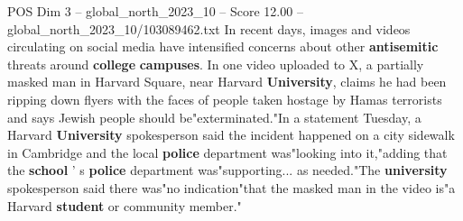\begin{textsample}{POS Dim 3 – global\_north\_2023\_10 – Score 12.00 – global\_north\_2023\_10/103089462.txt}
In recent days, images and videos circulating on social media have intensified concerns about other \textbf{antisemitic} threats around \textbf{college} \textbf{campuses}.
In one video uploaded to X, a partially masked man in Harvard Square, near Harvard \textbf{University}, claims he had been ripping down flyers with the faces of people taken hostage by Hamas terrorists and says Jewish people should be"exterminated."In a statement Tuesday, a Harvard \textbf{University} spokesperson said the incident happened on a city sidewalk in Cambridge and the local \textbf{police} department was"looking into it,"adding that the \textbf{school} ' s \textbf{police} department was"supporting... as needed."The \textbf{university} spokesperson said there was"no indication"that the masked man in the video is"a Harvard \textbf{student} or community member."

\end{textsample}
